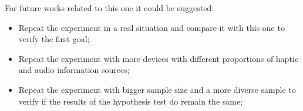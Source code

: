 For future works related to this one it could be suggested:

\begin{itemize}
    \item Repeat the experiment in a real situation and compare it with this one to verify the first goal;
    \item Repeat the experiment with more devices with different proportions of haptic and audio information sources;
    \item Repeat the experiment with bigger sample size and a more diverse sample to verify if the results of the hypothesis test do remain the same;
\end{itemize}